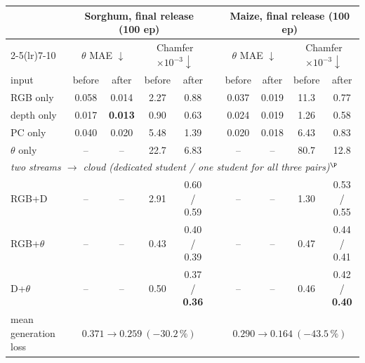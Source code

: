 \begin{table}[t]
  \centering\scriptsize
  \setlength{\tabcolsep}{3.6pt}
  \begin{tabular}{l cc cc c cc cc}
    \toprule
    & \multicolumn{4}{c}{Sorghum, final release (100 ep)} & & \multicolumn{4}{c}{Maize, final release (100 ep)} \\
    \cmidrule(lr){2-5}\cmidrule(lr){7-10}
    & \multicolumn{2}{c}{$\theta$ MAE $\downarrow$} & \multicolumn{2}{c}{Chamfer $\times10^{-3}\downarrow$} & & \multicolumn{2}{c}{$\theta$ MAE $\downarrow$} & \multicolumn{2}{c}{Chamfer $\times10^{-3}\downarrow$} \\
    input & before & after & before & after & & before & after & before & after \\
    \midrule
    RGB only    & 0.058 & 0.014 & 2.27 & 0.88 & & 0.037 & 0.019 & 11.3 & 0.77 \\
    depth only  & 0.017 & \textbf{0.013} & 0.90 & 0.63 & & 0.024 & 0.019 & 1.26 & 0.58 \\
    PC only     & 0.040 & 0.020 & 5.48 & 1.39 & & 0.020 & 0.018 & 6.43 & 0.83 \\
    $\theta$ only & -- & -- & 22.7 & 6.83 & & -- & -- & 80.7 & 12.8 \\
    \midrule
    \multicolumn{10}{l}{\emph{two streams $\to$ cloud (dedicated student / one student for all three pairs)$^\P$}} \\
    RGB+D       & -- & -- & 2.91 & 0.60 / 0.59 & & -- & -- & 1.30 & 0.53 / 0.55 \\
    RGB+$\theta$ & -- & -- & 0.43 & 0.40 / 0.39 & & -- & -- & 0.47 & 0.44 / 0.41 \\
    D+$\theta$   & -- & -- & 0.50 & 0.37 / \textbf{0.36} & & -- & -- & 0.46 & 0.42 / \textbf{0.40} \\
    \midrule
    mean generation loss & \multicolumn{4}{c}{$0.371 \to 0.259\ (-30.2\,\%)$} & & \multicolumn{4}{c}{$0.290 \to 0.164\ (-43.5\,\%)$} \\

\end{tabular}
\end{table}
